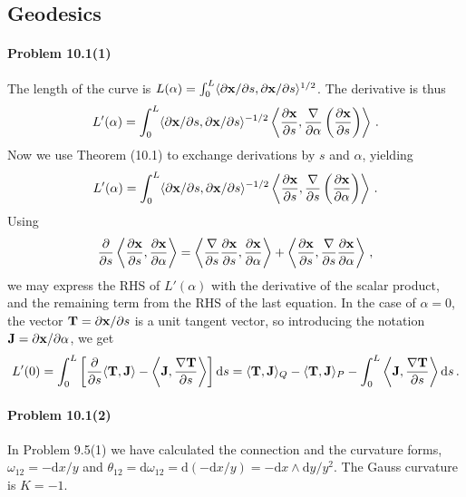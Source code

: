\documentclass[a4paper,12pt]{article}
\def\d{\mathrm{d}}
\newcommand{\problem}[1]{\paragraph{Problem #1}}
\begin{document}

\subsection{Geodesics}

\problem{10.1(1)} The length of the curve is $L(\alpha) = \int_0^L \langle \partial {\bf x} / \partial s, \partial {\bf x}/\partial s\rangle^{1/2}$. The derivative is thus
\[
L'(\alpha) = \int_0^L \langle \partial {\bf x} / \partial s, \partial {\bf x}/\partial s\rangle^{-1/2} \left\langle \frac{\partial {\bf x}}{\partial s}, \frac{\nabla}{\partial\alpha} \left(\frac{\partial {\bf x}}{\partial s}\right)\right\rangle\,.
\]
Now we use Theorem (10.1) to exchange derivations by $s$ and $\alpha$, yielding
\[
 L'(\alpha) = \int_0^L \langle \partial {\bf x} / \partial s, \partial {\bf x}/\partial s\rangle^{-1/2} \left\langle \frac{\partial {\bf x}}{\partial s}, \frac{\nabla}{\partial s} \left(\frac{\partial {\bf x}}{\partial \alpha}\right)\right\rangle\,.
\]
Using
\[
\frac{\partial}{\partial s} \left\langle \frac{\partial \bf x}{\partial s}, \frac{\partial \bf x}{\partial \alpha} \right\rangle = \left\langle \frac{\nabla}{\partial s}\frac{\partial\bf x}{\partial s}, \frac{\partial \bf x}{\partial\alpha}\right\rangle + \left\langle \frac{\partial\bf x}{\partial s}, \frac{\nabla}{\partial s}\frac{\partial \bf x}{\partial\alpha}\right\rangle\,,
\]
we may express the RHS of $L'(\alpha)$ with the derivative of the scalar product, and the remaining term from the RHS of the last equation. In the case of $\alpha=0$, the vector ${\bf T} = \partial {\bf x}/\partial s$ is a unit tangent vector, so introducing the notation ${\bf J}=\partial {\bf x}/\partial \alpha$, we get
\[
 L'(0) = \int_0^L \left[\frac{\partial}{\partial s}\langle {\bf T}, {\bf J}\rangle - \left\langle {\bf J}, \frac{\nabla\bf T}{\partial s}\right\rangle\right]\d s = \langle {\bf T}, {\bf J}\rangle_{Q}-\langle {\bf T}, {\bf J}\rangle_{P}-\int_0^L \left\langle {\bf J}, \frac{\nabla\bf T}{\partial s}\right\rangle\d s\,.
\]


\problem{10.1(2)} In Problem 9.5(1) we have calculated the connection and the curvature forms, $\omega_{12} = -\d x/y$ and $\theta_{12}=\d \omega_{12} = \d(-\d x/y) = -\d x\wedge\d y/y^2$. The Gauss curvature is $K=-1$.
\end{document}
